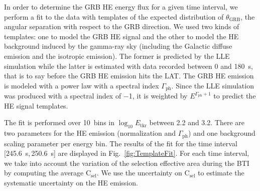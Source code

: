 \documentclass[preprint]{aastex631}
\begin{document}
In order to determine the GRB HE energy flux for a given time interval, we perform a fit to the data with templates of the expected distribution of $\theta_\mathrm{GRB}$, the angular separation with respect to the GRB direction. We used two kinds of templates: one to model the GRB HE signal and the other to model the HE background induced by the gamma-ray sky (including the Galactic diffuse emission and the isotropic emission). The former is predicted by the LLE simulation while the latter is estimated with data recorded between 0 and 180~s, that is to say before the GRB HE emission hits the LAT. The GRB HE emission is modeled with a power law with a spectral index $\Gamma_\mathrm{ph}$. Since the LLE simulation was produced with a spectral index of $-$1, it is weighted by $E^{\Gamma_\mathrm{ph}+1}$ to predict the HE signal templates.

The fit is performed over 10~bins in $\log_{10}E_\mathrm{tkr}$ between 2.2 and 3.2. There are two parameters for the HE emission (normalization and $\Gamma_\mathrm{ph}$) and one background scaling parameter per energy bin. The results of the fit for the time interval [245.6~s,\,250.6~s] are displayed in Fig.~\ref{fig:TemplateFit}. For each time interval, we take into account the variation of the selection effective area during the BTI by computing the average $\mathrm{C}_\mathrm{sel}$. We use the uncertainty on $\mathrm{C}_\mathrm{sel}$ to estimate the systematic uncertainty on the HE emission.
\end{document}
